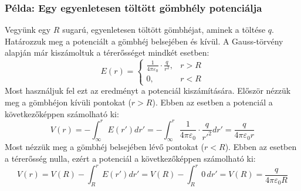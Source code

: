 \documentclass[a4paper,12pt]{article}
\begin{document}
\subsubsection*{Példa: Egy egyenletesen töltött gömbhély potenciálja}
Vegyünk egy $R$ sugarú, egyenletesen töltött gömbhéjat, aminek a töltése $q$. Határozzuk meg a potenciált a gömbhéj belsejében és kívül.
A Gauss-törvény alapján már kiszámoltuk a térerősséget mindkét esetben:
\begin{equation}
    E(r) = \begin{cases}
        \frac{1}{4 \pi \varepsilon_0} \cdot \frac{q}{r^2}, & r > R \\
        0, & r < R
    \end{cases}
\end{equation}
Most használjuk fel ezt az eredményt a potenciál kiszámítására. Először nézzük meg a gömbhéjon kívüli pontokat ($r > R$). Ebben az esetben a potenciál a következőképpen számolható ki:
\begin{equation}
    V(r) = - \int_{\infty}^{r} E(r') dr' = - \int_{\infty}^{r} \frac{1}{4 \pi \varepsilon_0} \cdot \frac{q}{r'^2} dr' = \frac{{q}}{4 \pi \varepsilon_0 r}
\end{equation}
Most nézzük meg a gömbhéj belsejében lévő pontokat ($r < R$). Ebben az esetben a térerősség nulla, ezért a potenciál a következőképpen számolható ki:
\begin{equation}
    V(r) = V(R) - \int_{R}^{r} E(r') dr' = V(R) - \int_{R}^{r} 0 \, dr' = V(R) = \frac{q}{4 \pi \varepsilon_0 R}
\end{equation}
\end{document}
